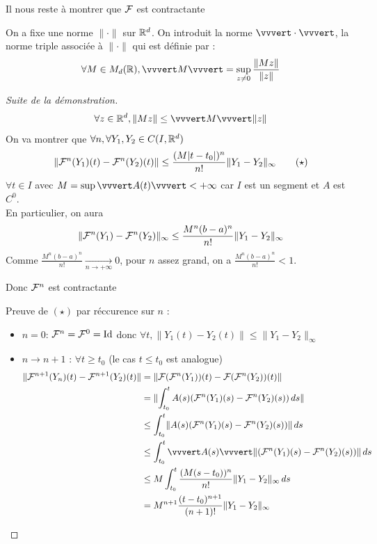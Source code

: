 \documentclass[]{report}
\begin{document}
Il nous reste à montrer que $\mathcal{F}$ est contractante

\begin{re}
    On a fixe une norme $\lVert\cdot \rVert$ sur $\mathbb{R}^d$. On introduit la norme $\vvvert\cdot\vvvert$, la norme triple associée à $\lVert\cdot\rVert$ qui est définie par :
    \[\forall M\in M_d(\R),\vvvert M \vvvert=\sup_{z\neq 0} \frac{\lVert M z\rVert}{\lVert z \rVert}\]
\end{re}

\begin{proof}[Suite de la démonstration]
    \[\forall z\in \R^d,\lVert Mz\rVert\le\vvvert M\vvvert \lVert z \rVert\]
    On va montrer que $\forall n,\forall Y_1,Y_2\in C(I,\mathbb{R}^d)$
    \[\lVert\mathcal{F}^n(Y_1)(t)-\mathcal{F}^n(Y_2)(t)\rVert\le \frac{(M|t-t_0|)^n}{n!}\lVert Y_1-Y_2\rVert_{\infty} \qquad (\star)\]
    $\forall t\in I$ avec $M=\sup \vvvert A(t) \vvvert <+\infty$ car $I$ est un segment et $A$ est $C^0$.\\
    En particulier, on aura
    \[\lVert \mathcal{F}^n(Y_1)-\mathcal{F}^n(Y_2)\rVert_\infty\le \frac{M^n(b-a)^n}{n!}\lVert Y_1-Y_2\rVert_\infty\]
    Comme $\displaystyle{\frac{M^n(b-a)^n}{n!}\xrightarrow[n\to+\infty]{}0}$, pour $n$ assez grand, on a $\frac{M^n(b-a)^n}{n!}<1$.
    \begin{center}
        Donc $\mathcal{F}^n$ est contractante
    \end{center}
    Preuve de $(\star)$ par réccurence sur $n$ :\\
    \begin{itemize}
        \item $n=0$: $\mathcal{F}^n=\mathcal{F}^0=\text{Id}$ donc $\forall t,\lVert Y_1(t)-Y_2(t)\rVert\le \lVert Y_1-Y_2\rVert_\infty$
        \item $n\to n+1$ : $\forall t\ge t_0$ (le cas $t\le t_0$ est analogue)
        \begin{align*}\lVert \Fr^{n+1}(Y_n)(t) -\Fr^{n+1}(Y_2)(t) \rVert&=\lVert \Fr(\Fr^n(Y_1))(t)-\Fr(\Fr^n(Y_2))(t) \rVert\\
            &=\lVert \int_{t_0}^t A(s)(\Fr^n(Y_1)(s)-\Fr^n(Y_2)(s))\,ds \rVert\\
            &\le \int_{t_0}^t \lVert A(s)(\Fr^n(Y_1)(s)-\Fr^n(Y_2)(s)) \rVert \,ds\\
            &\le \int_{t_0}^t \vvvert A(s)\vvvert \lVert(\Fr^n(Y_1)(s)-\Fr^n(Y_2)(s)) \rVert \,ds\\
            &\le M \int_{t_0}^t \frac{(M(s-t_0))^n}{n!}\lVert Y_1-Y_2\rVert_\infty\,ds\\
            &=M^{n+1} \frac{(t-t_0)^{n+1}}{(n+1)!}\lVert Y_1-Y_2 \rVert_\infty
        \end{align*}
    \end{itemize}
\end{proof}
\end{document}
